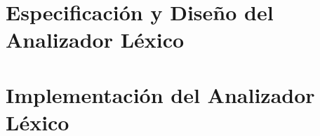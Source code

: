\section{Especificación y Diseño del Analizador Léxico}

\section{Implementación del Analizador Léxico}